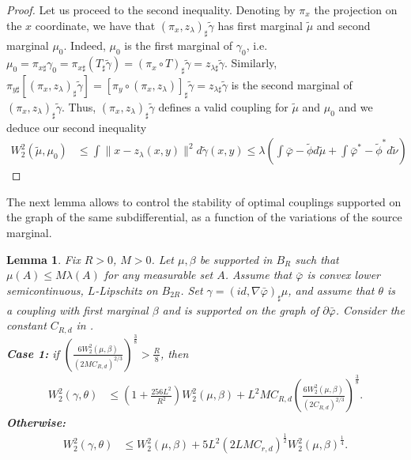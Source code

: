 \documentclass[11pt]{article}
\newtheorem{lemma}{Lemma}[section]
\newcommand{\1}{\mathbbm{1}}
\numberwithin{equation}{section}
\begin{document}
\begin{proof}
    Let us proceed to the second inequality. Denoting by $\pi_x$ the projection on the $x$ coordinate, we have that $(\pi_x, z_\lambda)_\sharp \tilde{\gamma}$ has first marginal $\tilde{\mu}$ and second marginal $\mu_0$. Indeed, $\mu_0$ is the first marginal of $\gamma_0$, i.e. $\mu_0=\pi_{x\sharp}\gamma_0 = \pi_{x\sharp} (T_\sharp \tilde{\gamma})=(\pi_x\circ T)_\sharp\tilde{\gamma}=z_{\lambda\sharp}\tilde{\gamma}$. Similarly, $\pi_{y\sharp}[(\pi_x,z_\lambda)_\sharp\tilde{\gamma}] = [\pi_{y}\circ(\pi_x,z_\lambda)]_\sharp\tilde{\gamma}=z_{\lambda\sharp}\tilde{\gamma}$ is the second marginal of $(\pi_x, z_\lambda)_\sharp \tilde{\gamma}$. Thus, $(\pi_x, z_\lambda)_\sharp \tilde{\gamma}$ defines a valid coupling for $\tilde{\mu}$ and $\mu_0$ and we deduce our second inequality
    \begin{align*}
    	W_2^2(\tilde{\mu}, \mu_0) & \leq \int \|x-z_\lambda (x,y)\|^2 d\tilde{\gamma}(x,y) \leq \lambda \left(\int \bar{\varphi} - \tilde{\phi} d\tilde{\mu} + \int \bar{\varphi}^* - \tilde{\phi}^* d\tilde{\nu} \right)
    \end{align*}
\end{proof}   
The next lemma allows to control the stability of optimal couplings supported on the graph of the same subdifferential, as a function of the variations of the source marginal.
\begin{lemma}
    
	Fix $R > 0$, $M>0$.
	Let $\mu,\beta$ be supported in $B_R$ such that $\mu(A) \leq M\lambda(A)$ for any measurable set $A$. Assume that $\bar{\varphi}$ is convex lower semicontinuous, $L$-Lipschitz on $B_{2R}$. Set $\gamma = (id, \nabla \bar{\varphi})_\sharp \mu$, and assume that $\theta$ is a coupling with first marginal $\beta$ and is supported on the graph of $\partial \bar{\varphi}$. Consider the constant $C_{R,d}$ in .\\
	\textbf{Case 1:} if $\left(\frac{6W_2^2(\mu,\beta)}{(2MC_{R,d})^{2/3}}\right)^{\frac{3}{8}} > \frac{R}{8}$, then 
	\begin{align*}
		W_2^2(\gamma, \theta) &\leq \left( 1 + \frac{256L^2}{R^2}\right)W_2^2(\mu,\beta) + L^2M C_{R,d}\left(\frac{6W_2^2(\mu,\beta)}{(2C_{R,d})^{2/3}}\right)^{\frac{3}{8}}.
	\end{align*}
	\textbf{Otherwise:} 
	\begin{align*}
		W_2^2(\gamma, \theta) 
		&\leq W_2^2(\mu,\beta) +  5 L^2 (2LMC_{r,d})^{\frac{1}{2}}  W_2^2(\mu,\beta)^{\frac{1}{4}}.
	\end{align*}
	\label{lem:extensionStability}
\end{lemma}
\end{document}
